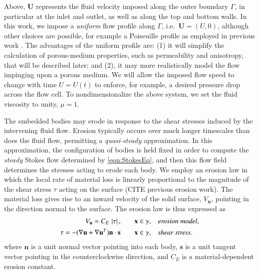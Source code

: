 \documentclass[3p]{elsarticle}
\newcommand{\nn}{{\mathbf{n}}}
\renewcommand{\ss}{{\mathbf{s}}}
\newcommand{\uu}{{\mathbf{u}}}
\newcommand{\UU}{{\mathbf{U}}}
\newcommand{\xx}{{\mathbf{x}}}
\newcommand{\abs}[1]{\left| #1 \right|}
\newcommand{\Vn}{V_\nn}
\newcommand{\CE}{C_E}
\begin{document}
Above, $\UU$ represents the fluid velocity imposed along the outer boundary $\Gamma$, in particular at the inlet and outlet, as well as along the top and bottom walls. In this work, we impose a {\em uniform} flow profile along $\Gamma$, i.e.~$\UU = (U,0)$, although other choices are possible, for example a Poiseuille profile as employed in previous work \cite{quaife2018boundary, chiu2020viscous}. The advantages of the uniform profile are: (1) it will simplify the calculation of porous-medium properties, such as permeability and anisotropy, that will be described later; and (2), it may more realistically model the flow impinging upon a porous medium. We will allow the imposed flow speed to change with time $U = U(t)$ to enforce, for example, a desired pressure drop across the flow cell. To nondimensionalize the above system, we set the fluid viscosity to unity, $\mu = 1$.

The embedded bodies may erode in response to the shear stresses induced by the intervening fluid flow. Erosion typically occurs over much longer timescales than does the fluid flow, permitting a {\em quasi-steady} approximation. In this approximation, the configuration of bodies is held fixed in order to compute the {\em steady} Stokes flow determined by \eqref{eqn:StokesEq}, and then this flow field determines the stresses acting to erode each body. We employ an erosion law in which the local rate of material loss is linearly proportional to the magnitude of the shear stress $\tau$ acting on the surface (CITE previous erosion work). The material loss gives rise to an inward velocity of the solid surface, $\Vn$, pointing in the direction normal to the surface. The erosion law is thus expressed as
\begin{align}
\Vn = \CE \, \abs{\tau}, 
	&\hspace{20pt} \xx \in \gamma, &&\mbox{\em erosion model}, \\
\tau = -(\nabla \uu + \nabla \uu^T) \nn \cdot \ss
	&\hspace{20pt} \xx \in \gamma, &&\mbox{\em shear stress}.
  \label{eqn:shearStress}
\end{align}
where $\nn$ is a unit normal vector pointing into each body, $\ss$ is
a unit tangent vector pointing in the counterclockwise direction, and $\CE$ is a material-dependent erosion constant.

\end{document}
